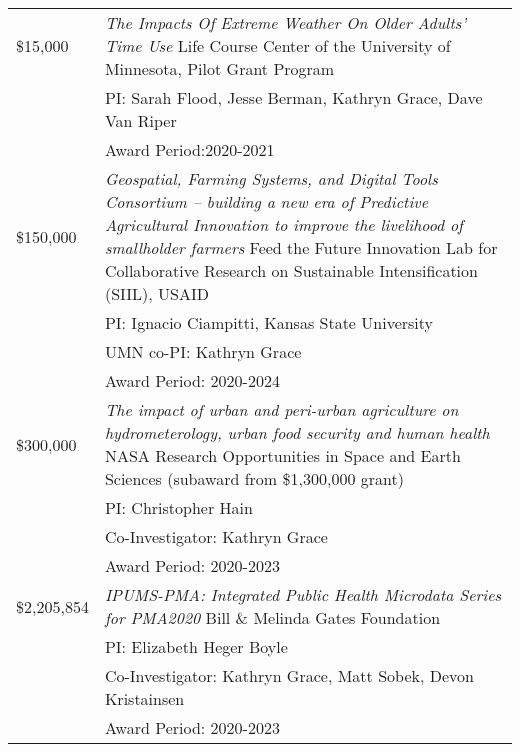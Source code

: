 \documentclass[11pt]{article} %
\begin{document}
\begin{tabular}{lp{11cm}}

\$15,000 &\emph{The Impacts Of Extreme Weather On Older Adults’ Time Use} Life Course Center of the University of Minnesota, Pilot Grant Program\\
&PI: Sarah Flood, Jesse Berman, Kathryn Grace, Dave Van Riper\\
&Award Period:2020-2021\\

\$150,000 &\emph{Geospatial, Farming Systems, and Digital Tools Consortium – building a new era of Predictive Agricultural Innovation to improve the livelihood of smallholder farmers} Feed the Future Innovation Lab for Collaborative Research on Sustainable Intensification (SIIL), USAID\\
&PI: Ignacio Ciampitti, Kansas State University\\
&UMN co-PI: Kathryn Grace\\
& Award Period: 2020-2024\\


\$300,000 & \emph{The impact of urban and peri-urban agriculture on hydrometerology, urban food security and human health} NASA Research Opportunities in Space and Earth Sciences (subaward from \$1,300,000 grant)\\
&PI: Christopher Hain\\
&Co-Investigator: Kathryn Grace\\
&Award Period: 2020-2023\\
  

\$2,205,854 & \emph{IPUMS-PMA: Integrated Public Health Microdata Series for PMA2020} Bill \& Melinda Gates Foundation\\
&PI: Elizabeth Heger Boyle\\
&Co-Investigator: Kathryn Grace, Matt Sobek, Devon Kristainsen\\
&Award Period: 2020-2023 \\

\end{tabular}
\end{document}

